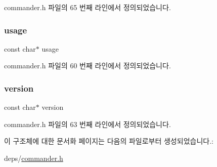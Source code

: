 commander.\+h 파일의 65 번째 라인에서 정의되었습니다.

\mbox{\label{structcommand_aef1bd6ad890a110b466cb0e8088507a2}} 
\subsubsection{\texorpdfstring{usage}{usage}}
{\footnotesize\ttfamily const char$\ast$ usage}



commander.\+h 파일의 60 번째 라인에서 정의되었습니다.

\mbox{\label{structcommand_aa31f487a99743d24af9076a3e11e5425}} 
\subsubsection{\texorpdfstring{version}{version}}
{\footnotesize\ttfamily const char$\ast$ version}



commander.\+h 파일의 63 번째 라인에서 정의되었습니다.



이 구조체에 대한 문서화 페이지는 다음의 파일로부터 생성되었습니다.\+:\begin{DoxyCompactItemize}
\item 
deps/\mbox{\hyperlink{commander_8h}{commander.\+h}}\end{DoxyCompactItemize}
